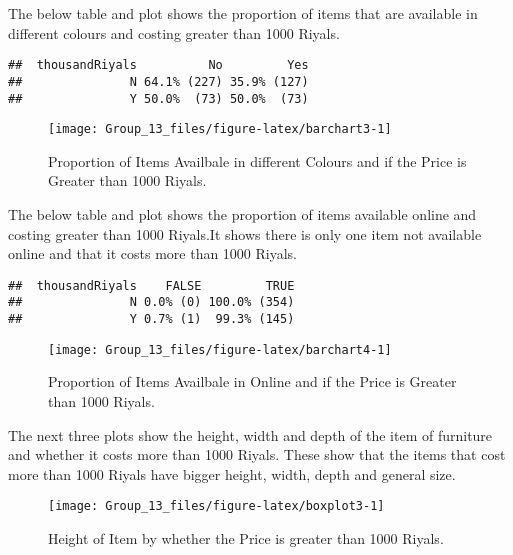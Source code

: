 \documentclass[
]{article}
\begin{document}
The below table and plot shows the proportion of items that are
available in different colours and costing greater than 1000 Riyals.

\begin{verbatim}
##  thousandRiyals          No         Yes
##               N 64.1% (227) 35.9% (127)
##               Y 50.0%  (73) 50.0%  (73)
\end{verbatim}

\begin{figure}[H]

{\centering \texttt{[image: Group\_13\_files/figure-latex/barchart3-1]} 

}

\caption{\label{fig:barchart3} Proportion of Items Availbale in different Colours and if the Price is Greater than 1000 Riyals.}\label{fig:barchart3}
\end{figure}

The below table and plot shows the proportion of items available online
and costing greater than 1000 Riyals.It shows there is only one item not
available online and that it costs more than 1000 Riyals.

\begin{verbatim}
##  thousandRiyals    FALSE         TRUE
##               N 0.0% (0) 100.0% (354)
##               Y 0.7% (1)  99.3% (145)
\end{verbatim}

\begin{figure}[H]

{\centering \texttt{[image: Group\_13\_files/figure-latex/barchart4-1]} 

}

\caption{\label{fig:barchart4} Proportion of Items Availbale in Online and if the Price is Greater than 1000 Riyals.}\label{fig:barchart4}
\end{figure}

The next three plots show the height, width and depth of the item of
furniture and whether it costs more than 1000 Riyals. These show that
the items that cost more than 1000 Riyals have bigger height, width,
depth and general size.

\begin{figure}[H]

{\centering \texttt{[image: Group\_13\_files/figure-latex/boxplot3-1]} 

}

\caption{\label{fig:boxplot3} Height of Item by whether the Price is greater than 1000 Riyals.}\label{fig:boxplot3}
\end{figure}
\end{document}
